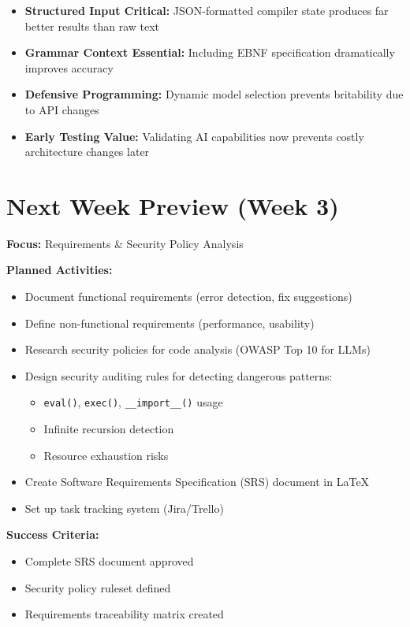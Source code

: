 \documentclass[a4paper,11pt]{article}
\begin{document}
\begin{itemize}[leftmargin=*]
    \item \textbf{Structured Input Critical:} JSON-formatted compiler state produces far better results than raw text
    \item \textbf{Grammar Context Essential:} Including EBNF specification dramatically improves accuracy
    \item \textbf{Defensive Programming:} Dynamic model selection prevents britability due to API changes
    \item \textbf{Early Testing Value:} Validating AI capabilities now prevents costly architecture changes later
\end{itemize}

\section{Next Week Preview (Week 3)}

\textbf{Focus:} Requirements \& Security Policy Analysis

\textbf{Planned Activities:}
\begin{itemize}[leftmargin=*]
    \item Document functional requirements (error detection, fix suggestions)
    \item Define non-functional requirements (performance, usability)
    \item Research security policies for code analysis (OWASP Top 10 for LLMs)
    \item Design security auditing rules for detecting dangerous patterns:
    \begin{itemize}
        \item \texttt{eval()}, \texttt{exec()}, \texttt{\_\_import\_\_()} usage
        \item Infinite recursion detection
        \item Resource exhaustion risks
    \end{itemize}
    \item Create Software Requirements Specification (SRS) document in LaTeX
    \item Set up task tracking system (Jira/Trello)
\end{itemize}

\textbf{Success Criteria:}
\begin{itemize}[leftmargin=*]
    \item Complete SRS document approved
    \item Security policy ruleset defined
    \item Requirements traceability matrix created
\end{itemize}
\end{document}
